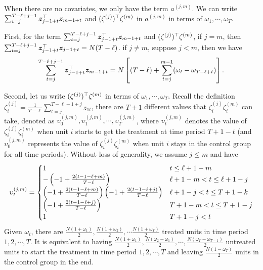 		
		When there are no covariates, we only have the term $a^{(j,m)}$. We can write $\sum_{t=j}^{T - \ell+j-1} \bm{z}_{j-1+t}^\top \bm{z}_{m-1+t} $ and $(\zeta^{(j)})^\top    \zeta^{(m)} $ in $a^{(j,m)}$ in terms of $\omega_1, \cdots, \omega_T$.
		
		First, for the term $\sum_{t=j}^{T - \ell+j-1} \bm{z}_{j-1+t}^\top \bm{z}_{m-1+t} $ and $(\zeta^{(j)})^\top    \zeta^{(m)} $,  if $j = m$, then  $\sum_{t=j}^{T - \ell+j-1} \bm{z}_{j-1+t}^\top \bm{z}_{j-1+t} = N(T - \ell)$. if $j \neq m$, suppose $j < m$, then we have 
		\[\sum_{t=j}^{T - \ell+j-1} \bm{z}_{j-1+t}^\top \bm{z}_{m-1+t} = N \left[ (T - \ell) + \sum_{t = j}^{m-1} (\omega_t  -  \omega_{T - \ell+t})\right].  \]
		
		Second, let us write $(\zeta^{(j)})^\top \zeta^{(m)}$ in terms of $\omega_1, \cdots, \omega_T$.
		Recall the definition $\zeta^{(j)}_i = \frac{1}{T - \ell} \sum_{t=j}^{T - \ell-1+j} z_{1t} $, there are $T+1$ different values that $\zeta_i^{(j)} \zeta_i^{(m)}$ can take, denoted as $\upsilon_0^{(j,m)}, \upsilon_1^{(j,m)}, \cdots, \upsilon_T^{(j,m)}$, where $\upsilon_t^{(j,m)}$ denotes the value of $\zeta_i^{(j)} \zeta_i^{(m)}$ when unit $i$ starts to get  the treatment at time period $T+1-t$ (and $\upsilon_0^{(j,m)}$ represents the value of $\zeta_i^{(j)} \zeta_i^{(m)}$ when unit $i$ stays in the control group for all time periods). Without loss of generality, we assume $j \leq m$ and have
		\begin{eqnarray*}
			\upsilon_t^{(j,m)} = \begin{cases}
				1 &  t \leq \ell+1-m\\
				-\left( -1 + \frac{2(t-1-\ell+m)}{T - \ell} \right) & \ell+1-m < t \leq \ell+1-j \\
				\left(  -1 + \frac{2(t-1-\ell+m)}{T - \ell} \right) \left(  -1 + \frac{2(t-1-\ell+j)}{T - \ell} \right) & \ell+1-j < t \leq T+1-k \\
				\left(  -1 + \frac{2(t-1-\ell+j)}{T - \ell} \right) & T+1-m < t \leq T+1-j \\
				1 & T+1-j < t \\
			\end{cases}
		\end{eqnarray*}
		Given $\omega_t$, there are $\frac{N(1+ \omega_1)}{2}, \frac{N(1+\omega_2)}{2}, \cdots \frac{N(1+\omega_T)}{2}$ treated units in time period $1, 2, \cdots, T$. It is equivalent to having  $\frac{N(1+\omega_1)}{2}, \frac{N(\omega_2 - \omega_1)}{2}, \cdots,\frac{N(\omega_T-\omega_{T-1})}{2}$ untreated units to start the treatment in time period $1, 2, \cdots, T$ and leaving $\frac{N(1-\omega_T)}{2}$ units in the control group in the end. 

